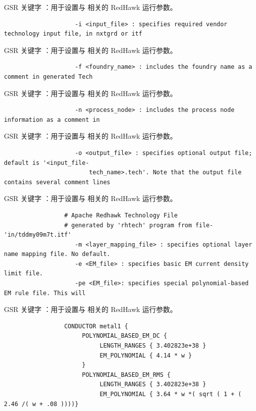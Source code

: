 GSR 关键字 ：用于设置与  相关的 RedHawk 运行参数。

\begin{lstlisting}
                    -i <input_file> : specifies required vendor technology input file, in nxtgrd or itf
\end{lstlisting}

GSR 关键字 ：用于设置与  相关的 RedHawk 运行参数。

\begin{lstlisting}
                    -f <foundry_name> : includes the foundry name as a comment in generated Tech
\end{lstlisting}

GSR 关键字 ：用于设置与  相关的 RedHawk 运行参数。

\begin{lstlisting}
                    -n <process_node> : includes the process node information as a comment in
\end{lstlisting}

GSR 关键字 ：用于设置与  相关的 RedHawk 运行参数。

\begin{lstlisting}
                    -o <output_file> : specifies optional output file; default is '<input_file-
                        tech_name>.tech'. Note that the output file contains several comment lines
\end{lstlisting}

GSR 关键字 ：用于设置与  相关的 RedHawk 运行参数。

\begin{lstlisting}
                 # Apache Redhawk Technology File
                 # generated by 'rhtech' program from file- 'in/tddmy09m7t.itf'
                    -m <layer_mapping_file> : specifies optional layer name mapping file. No default.
                    -e <EM_file> : specifies basic EM current density limit file.
                    -pe <EM_file>: specifies special polynomial-based EM rule file. This will
\end{lstlisting}

GSR 关键字 ：用于设置与  相关的 RedHawk 运行参数。

\begin{lstlisting}
                 CONDUCTOR metal1 {
                      POLYNOMIAL_BASED_EM_DC {
                           LENGTH_RANGES { 3.402823e+38 }
                           EM_POLYNOMIAL { 4.14 * w }
                      }
                      POLYNOMIAL_BASED_EM_RMS {
                           LENGTH_RANGES { 3.402823e+38 }
                           EM_POLYNOMIAL { 3.64 * w *( sqrt ( 1 + ( 2.46 /( w + .08 ))))}
\end{lstlisting}

